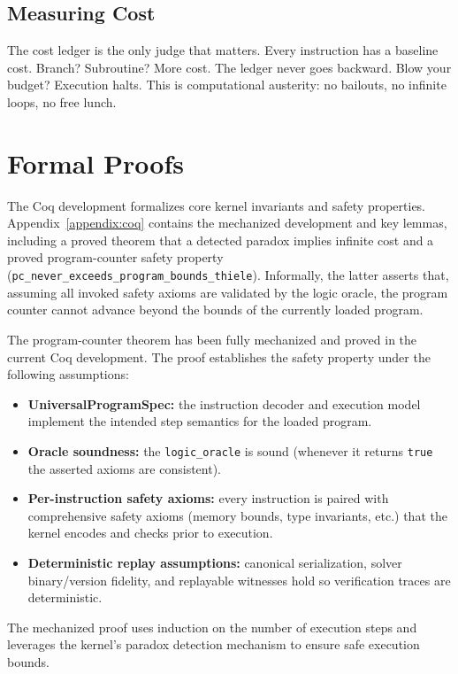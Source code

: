 \documentclass[11pt]{article}
\begin{document}
\subsection{Measuring Cost}
The cost ledger is the only judge that matters. Every instruction has a baseline cost. Branch? Subroutine? More cost. The ledger never goes backward. Blow your budget? Execution halts. This is computational austerity: no bailouts, no infinite loops, no free lunch.

\section{Formal Proofs}
The Coq development formalizes core kernel invariants and safety properties. Appendix~\ref{appendix:coq} contains the mechanized development and key lemmas, including a proved theorem that a detected paradox implies infinite cost and a proved program-counter safety property (\texttt{pc\_never\_exceeds\_program\_bounds\_thiele}). Informally, the latter asserts that, assuming all invoked safety axioms are validated by the logic oracle, the program counter cannot advance beyond the bounds of the currently loaded program.

The program-counter theorem has been fully mechanized and proved in the current Coq development. The proof establishes the safety property under the following assumptions:

\begin{itemize}
  \item \textbf{UniversalProgramSpec:} the instruction decoder and execution model implement the intended step semantics for the loaded program.
  \item \textbf{Oracle soundness:} the \texttt{logic\_oracle} is sound (whenever it returns \texttt{true} the asserted axioms are consistent).
  \item \textbf{Per-instruction safety axioms:} every instruction is paired with comprehensive safety axioms (memory bounds, type invariants, etc.) that the kernel encodes and checks prior to execution.
  \item \textbf{Deterministic replay assumptions:} canonical serialization, solver binary/version fidelity, and replayable witnesses hold so verification traces are deterministic.
\end{itemize}

The mechanized proof uses induction on the number of execution steps and leverages the kernel's paradox detection mechanism to ensure safe execution bounds.
\end{document}
